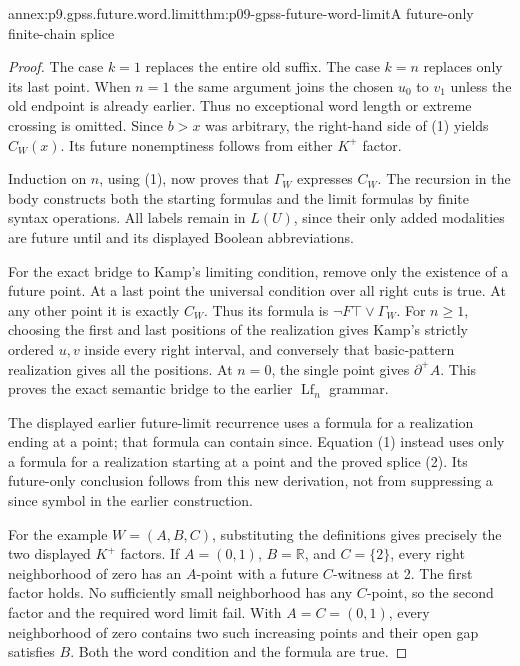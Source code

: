 \begin{annexitem}{annex:p9.gpss.future.word.limit}{thm:p09-gpss-future-word-limit}{A future-only finite-chain splice}
\begin{proof}
The case \(k=1\) replaces the entire old suffix. The case
\(k=n\) replaces only its last point. When \(n=1\) the
same argument joins the chosen \(u_0\) to \(v_1\) unless
the old endpoint is already earlier. Thus no exceptional word
length or extreme crossing is omitted. Since \(b>x\) was
arbitrary, the right-hand side of (1) yields \(C_W(x)\).
Its future nonemptiness follows from either \(K^+\) factor.

Induction on \(n\), using (1), now proves that \(\Gamma_W\)
expresses \(C_W\). The recursion in the body constructs both
the starting formulas and the limit formulas by finite syntax
operations. All labels remain in \(L(U)\), since their only
added modalities are future until and its displayed Boolean
abbreviations.

For the exact bridge to Kamp's limiting condition, remove only
the existence of a future point. At a last point the universal
condition over all right cuts is true. At any other point it is
exactly \(C_W\). Thus its formula is
\(\neg F\top\lor\Gamma_W\). For \(n\geq1\), choosing
the first and last positions of the realization gives Kamp's
strictly ordered \(u,v\) inside every right interval, and
conversely that basic-pattern realization gives all the positions.
At \(n=0\), the single point gives \(\partial^+A\).
This proves the exact semantic bridge to the earlier
\(\operatorname{Lf}_n\) grammar.

The displayed earlier future-limit recurrence uses a formula for
a realization ending at a point; that formula can contain since.
Equation (1) instead uses only a formula for a realization
starting at a point and the proved splice (2). Its future-only
conclusion follows from this new derivation, not from suppressing
a since symbol in the earlier construction.

For the example \(W=(A,B,C)\), substituting the definitions
gives precisely the two displayed \(K^+\) factors. If
\(A=(0,1)\), \(B=\mathbb R\), and \(C=\{2\}\),
every right neighborhood of zero has an \(A\)-point with a
future \(C\)-witness at 2. The first factor holds. No sufficiently
small neighborhood has any \(C\)-point, so the second factor
and the required word limit fail. With \(A=C=(0,1)\),
every neighborhood of zero contains two such increasing points
and their open gap satisfies \(B\). Both the word condition
and the formula are true.
\end{proof}
\end{annexitem}

